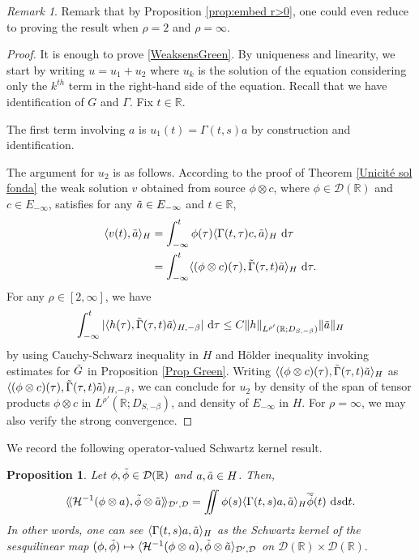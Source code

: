 \documentclass[11pt, letterpaper]{amsart}
\newtheorem{prop}[thm]{Proposition}
\theoremstyle{definition}
\theoremstyle{remark}
\newtheorem{rem}[thm]{Remark}
\newcommand{\llangle}{\langle\!\langle}
\newcommand{\rrangle}{\rangle\!\rangle}
\numberwithin{equation}{section}
\begin{document}
\begin{rem}
    Remark that by Proposition \ref{prop:embed r>0}, one could even reduce to proving the result when $\rho=2$ and $\rho=\infty$.
\end{rem}
\begin{proof}
It is enough to prove \eqref{WeaksensGreen}. By uniqueness and linearity, we start by writing $u=u_1+u_2$ where $u_k$ is the solution of the equation considering only the $k^{th}$ term in the right-hand side of the equation. Recall that we have identification of $G$ and $\Gamma$. Fix $t \in \mathbb{R}.$

The first term involving $a$ is  $u_1(t)=\Gamma(t,s)a$ by construction and identification.

The argument for $u_2$ is as follows.  
According to the proof of Theorem \ref{Unicité sol fonda} the weak solution $v$ obtained from source $\phi\otimes c$, where $\phi\in \mathcal{D}(\mathbb{R})$ and $c \in E_{-\infty}$, satisfies for any 
$\Tilde{a} \in E_{-\infty}$ and $t\in \mathbb{R}$, 
\begin{align*}
    \langle v(t), \Tilde{a} \rangle_H &= \int_{-\infty}^{t}\phi(\tau)  \langle \Gamma(t,\tau)c, \Tilde{a} \rangle_H \ \mathrm{d}\tau
    \\&= \int_{-\infty}^{t} \langle (\phi\otimes c)(\tau), \Tilde{\Gamma}(\tau,t)\Tilde{a}  \rangle_H \ \mathrm{d}\tau.
    \end{align*}
For any $\rho\in [2,\infty]$, we have  $$ \int_{-\infty}^{t} |\langle h(\tau),\Tilde{\Gamma}(\tau,t) \Tilde{a}  \rangle_{H,-\beta}| \ \mathrm{d}\tau 
\le C \|h\|_{L^{\rho'}(\mathbb{R};D_{S,-\beta})} \|\Tilde{a}\|_H$$
 by using Cauchy-Schwarz inequality in $H$ and  H\"older inequality invoking   estimates for  $\Tilde{G}$ in Proposition \ref{Prop Green}.
 Writing $\langle (\phi\otimes c)(\tau), \Tilde{\Gamma}(\tau,t)\Tilde{a}  \rangle_H$ as $\langle (\phi\otimes c)(\tau), \Tilde{\Gamma}(\tau,t)\Tilde{a}  \rangle_{H,-\beta}$, we can conclude for $u_2$ 
 by density  of the span of tensor products $\phi\otimes c$  in $L^{\rho'}(\mathbb{R};D_{S,-\beta})$, 
 and density of $E_{-\infty}$ in $H$.   
For $\rho=\infty$, we may also verify the strong convergence.
\end{proof}
We record the following operator-valued Schwartz kernel result.
\begin{prop}
    Let $\phi,\Tilde{\phi}\in \mathcal{D}(\mathbb{R})$ and $a,\Tilde{a}\in H$. Then,
    \begin{equation*}
        \llangle \mathcal{H}^{-1}(\phi  \otimes a), \Tilde{\phi}\otimes \Tilde{a} \rrangle_{\mathcal{D}', \mathcal{D}} = \iint \phi(s) \langle \Gamma(t,s)a,  \Tilde{a} \rangle_H \overline{\Tilde{\phi}}(t) \ \mathrm d s\mathrm d t.
    \end{equation*}
    In other words, one can see $\langle \Gamma(t,s)a,  \Tilde{a} \rangle_H$ as the Schwartz kernel of the sesquilinear map $(\phi,\Tilde{\phi})\mapsto \langle \mathcal{H}^{-1}(\phi  \otimes a), \Tilde{\phi}\otimes \Tilde{a} \rangle_{\mathcal{D}', \mathcal{D}}$ on $\mathcal{D}(\mathbb{R})\times \mathcal{D}(\mathbb{R}).$
\end{prop}
\end{document}
